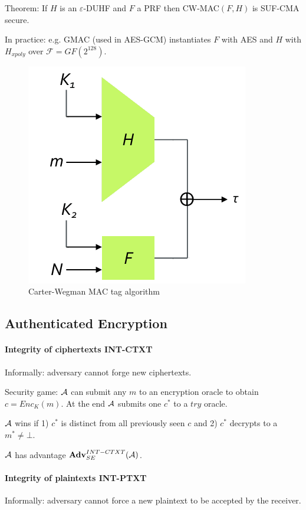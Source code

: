 Theorem:
If $H$ is an $\varepsilon$-DUHF and $F$ a PRF then CW-MAC$(F, H)$ is SUF-CMA secure.

In practice: e.g. GMAC (used in AES-GCM) instantiates $F$ with AES and $H$ with $H_{xpoly}$ over $\mathcal{F} = GF(2^{128})$.

\begin{figure}[h]
    \centering
	\includegraphics[scale=0.45]{images/carter-wegman.png}
    \caption{Carter-Wegman MAC tag algorithm}
    \label{fig:carter-wegman}
\end{figure}



\subsection{Authenticated Encryption}

\paragraph{Integrity of ciphertexts INT-CTXT}
Informally: adversary cannot forge new ciphertexts.

Security game:
$\mathcal{A}$ can submit any $m$ to an encryption oracle to obtain $c=Enc_K(m)$.
At the end $\mathcal{A}$ submits one $c^*$ to a $try$ oracle.

$\mathcal{A}$ wins if 1) $c^*$ is distinct from all previously seen $c$ and 2) $c^*$ decrypts to a $m^* \neq \bot$.

$\mathcal{A}$ has advantage $\mathbf{Adv}^{INT-CTXT}_{SE}(\mathcal{A})$.

\paragraph{Integrity of plaintexts INT-PTXT}
Informally: adversary cannot force a new plaintext to be accepted by the receiver.

